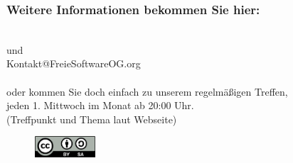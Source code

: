 \begin{frame}
\frametitle{Weitere Informationen bekommen Sie hier:}
  \begin{center}
  \Large{
    \fsog \\      %
    und \\
    Kontakt@FreieSoftwareOG.org \\~\\

    oder kommen Sie doch einfach zu unserem regelmäßigen Treffen, \\
    jeden 1. Mittwoch im Monat ab 20:00 Uhr. \\
    (Treffpunkt und Thema laut Webseite)
    }
  \end{center}
  \begin{figure}[ht]
    \centering
    \includegraphics[width=0.2\textwidth]{../gemeinsam/CC-BY-SA.png}
  \end{figure}  
\end{frame}

